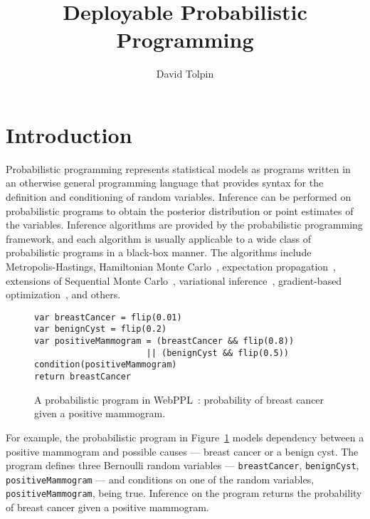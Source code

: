 \documentclass[sigplan,screen]{acmart}
\title{Deployable Probabilistic Programming}
\author{David Tolpin}
\affiliation{
    \institution{PUB+}
    \country{Israel}
}
\begin{document}
\maketitle

\begin{sloppypar}

\section{Introduction}

  Probabilistic programming \cite{GMR+08,MSP14,WVM14,GS15}
  represents statistical models as programs written in an
  otherwise general programming language that provides syntax
  for the definition and conditioning of random variables.
  Inference can be performed on probabilistic programs to
  obtain the posterior distribution or point estimates of the
  variables. Inference algorithms are provided by the
  probabilistic programming framework, and each algorithm is
  usually applicable to a wide class of probabilistic programs
  in a black-box manner. The algorithms include
  Metropolis-Hastings\cite{WSG11,MSP14,YHG14}, Hamiltonian
  Monte Carlo~\cite{Stan17}, expectation
  propagation~\cite{MWG+10}, extensions of Sequential Monte
  Carlo~\cite{WVM14,MYM+15,PWD+14,RNL+2016,MS18}, variational
  inference~\cite{WW13,KTR+17}, gradient-based
  optimization~\cite{Stan17,BCJ+19}, and others.

\begin{figure}
\begin{lstlisting}[language=WebPPL]
var breastCancer = flip(0.01)
var benignCyst = flip(0.2)
var positiveMammogram = (breastCancer && flip(0.8))
                      || (benignCyst && flip(0.5))
condition(positiveMammogram)
return breastCancer
\end{lstlisting}
  \caption{A probabilistic program in WebPPL~\cite{GS15}:
  probability of breast cancer given a positive mammogram.}
  \label{fig:mammo-webppl}
\end{figure}
  For example, the probabilistic program in
  Figure~\ref{fig:mammo-webppl} models dependency between
  a positive mammogram and possible causes --- breast cancer
  or a benign cyst.  The program defines three Bernoulli
  random variables  --- \lstinline{breastCancer},
  \lstinline{benignCyst}, \lstinline{positiveMammogram} ---
  and conditions on one of the random variables,
  \lstinline{positiveMammogram}, being true. Inference on the
  program returns the probability of breast cancer given a
  positive mammogram.


\end{sloppypar}
\end{document}
